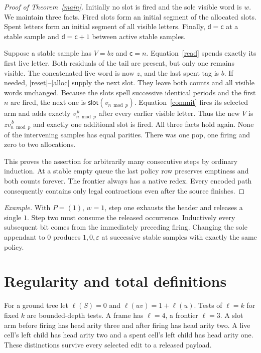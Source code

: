 \documentclass[11pt,letterpaper,oneside,reqno]{amsart}
\newcommand{\eps}{\varepsilon}
\newcommand{\slot}{\mathsf{slot}}
\newcommand{\cmt}{\mathsf c}
\newcommand{\pops}{\mathsf d}
\newcommand{\arity}{\ell}
\begin{document}
\begin{proof}[Proof of Theorem~\ref{main}]
Initially no slot is fired and the sole visible word is \(w\). We maintain three facts. Fired slots form an initial segment of the allocated slots. Spent letters form an initial segment of all visible letters. Finally, \(\pops=\cmt\) at a stable sample and \(\pops=\cmt+1\) between active stable samples.

Suppose a stable sample has \(V=bz\) and \(\cmt=n\). Equation~\eqref{read} spends exactly its first live letter. Both residuals of the tail are present, but only one remains visible. The concatenated live word is now \(z\), and the last spent tag is \(b\). If needed, \eqref{reset}--\eqref{alloc} supply the next slot. They leave both counts and all visible words unchanged. Because the slots spell successive identical periods and the first \(n\) are fired, the next one is \(\slot(v_{n\bmod p})\). Equation~\eqref{commit} fires its selected arm and adds exactly \(v_{n\bmod p}^{\,b}\) after every earlier visible letter. Thus the new \(V\) is \(zv_{n\bmod p}^{\,b}\) and exactly one additional slot is fired. All three facts hold again. None of the intervening samples has equal parities. There was one pop, one firing and zero to two allocations.

This proves the assertion for arbitrarily many consecutive steps by ordinary induction. At a stable empty queue the last policy row preserves emptiness and both counts forever. The frontier always has a native redex. Every encoded path consequently contains only legal contractions even after the source finishes.
\end{proof}

\textit{Example.} With \(P=(1)\), \(w=1\), step one exhausts the header and releases a single \(1\). Step two must consume the released occurrence. Inductively every subsequent bit comes from the immediately preceding firing. Changing the sole appendant to \(0\) produces \(1,0,\eps\) at successive stable samples with exactly the same policy.

\section{Regularity and total definitions}\label{regular}
For a ground tree let \(\arity(S)=0\) and \(\arity(uv)=1+\arity(u)\). Tests of \(\arity=k\) for fixed \(k\) are bounded-depth tests. A frame has \(\arity=4\), a frontier \(\arity=3\). A slot arm before firing has head arity three and after firing has head arity two. A live cell's left child has head arity two and a spent cell's left child has head arity one. These distinctions survive every selected edit to a released payload.
\end{document}
